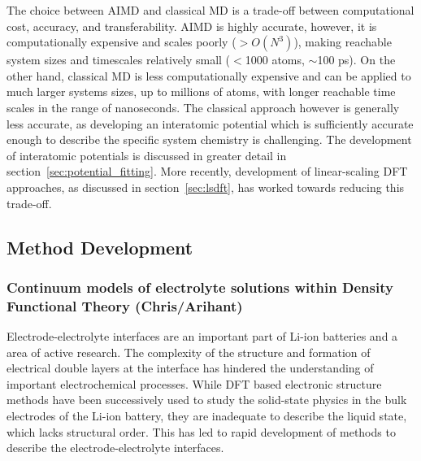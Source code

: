 \documentclass[../main.tex]{subfiles}
\begin{document}
The choice between AIMD and classical MD is a trade-off between computational cost, accuracy, and transferability. AIMD is highly accurate, however, it is computationally expensive and scales poorly ($>O(N^3)$), making reachable system sizes and timescales relatively small ($<$1000 atoms, $\sim$100 ps). On the other hand, classical MD is less computationally expensive and can be applied to much larger systems sizes, up to millions of atoms, with longer reachable time scales in the range of nanoseconds. The classical approach however is generally less accurate, as developing an interatomic potential which is sufficiently accurate enough to describe the specific system chemistry is challenging. The development of interatomic potentials is discussed in greater detail in section~\ref{sec:potential_fitting}. More recently, development of linear-scaling DFT approaches, as discussed in section~\ref{sec:lsdft}, has worked towards reducing this trade-off.

\subsection{Method Development}

\subsubsection{Continuum models of electrolyte solutions within Density Functional Theory (Chris/Arihant)}
\label{sec:dft+cont}
Electrode-electrolyte interfaces are an important part of Li-ion batteries and a area of active research.\cite{Gauthier2015, yu2018electrode} The complexity of the structure and formation of electrical double layers at the interface has hindered the understanding of important electrochemical processes. While DFT based electronic structure methods have been successively used to study the solid-state physics in the bulk electrodes of the Li-ion battery, they are inadequate to describe the liquid state, which lacks structural order. This has led to rapid development of methods to describe the electrode-electrolyte interfaces.\cite{Jinnouchi2018} 
\end{document}
